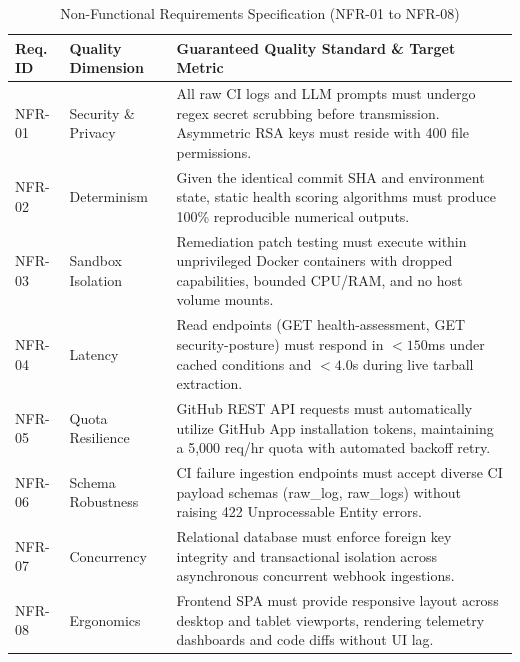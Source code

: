 \begin{table}[htbp]
    \centering
    \caption{Non-Functional Requirements Specification (NFR-01 to NFR-08)}
    \label{tab:non-functional-requirements}
    \small
    \begin{tabularx}{\textwidth}{p{} p{} p{}}
        \toprule
        \textbf{Req. ID} & \textbf{Quality Dimension} & \textbf{Guaranteed Quality Standard \& Target Metric} \\
        \midrule
        NFR-01 & Security \& Privacy & All raw CI logs and LLM prompts must undergo regex secret scrubbing before transmission. Asymmetric RSA keys must reside with 400 file permissions. \\
        \addlinespace
        NFR-02 & Determinism & Given the identical commit SHA and environment state, static health scoring algorithms must produce 100\% reproducible numerical outputs. \\
        \addlinespace
        NFR-03 & Sandbox Isolation & Remediation patch testing must execute within unprivileged Docker containers with dropped capabilities, bounded CPU/RAM, and no host volume mounts. \\
        \addlinespace
        NFR-04 & Latency & Read endpoints (GET health-assessment, GET security-posture) must respond in $< 150$ms under cached conditions and $< 4.0$s during live tarball extraction. \\
        \addlinespace
        NFR-05 & Quota Resilience & GitHub REST API requests must automatically utilize GitHub App installation tokens, maintaining a 5,000 req/hr quota with automated backoff retry. \\
        \addlinespace
        NFR-06 & Schema Robustness & CI failure ingestion endpoints must accept diverse CI payload schemas (raw\_log, raw\_logs) without raising 422 Unprocessable Entity errors. \\
        \addlinespace
        NFR-07 & Concurrency & Relational database must enforce foreign key integrity and transactional isolation across asynchronous concurrent webhook ingestions. \\
        \addlinespace
        NFR-08 & Ergonomics & Frontend SPA must provide responsive layout across desktop and tablet viewports, rendering telemetry dashboards and code diffs without UI lag. \\
        \bottomrule
    \end{tabularx}
\end{table}


